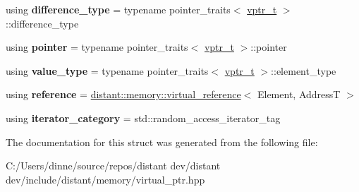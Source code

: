 \begin{DoxyCompactItemize}
\item 
\mbox{\label{structstd_1_1iterator__traits_3_01distant_1_1memory_1_1virtual__ptr_3_01_element_00_01_address_t_01_4_01_4_a0574fcbe68898aabe830c86f39a2679d}} 
using {\bfseries difference\+\_\+type} = typename pointer\+\_\+traits$<$ \mbox{\hyperlink{classdistant_1_1memory_1_1virtual__ptr}{vptr\+\_\+t}} $>$\+::difference\+\_\+type
\item 
\mbox{\label{structstd_1_1iterator__traits_3_01distant_1_1memory_1_1virtual__ptr_3_01_element_00_01_address_t_01_4_01_4_af3dc39ab8e8fcda98f26a58b6eef64a0}} 
using {\bfseries pointer} = typename pointer\+\_\+traits$<$ \mbox{\hyperlink{classdistant_1_1memory_1_1virtual__ptr}{vptr\+\_\+t}} $>$\+::pointer
\item 
\mbox{\label{structstd_1_1iterator__traits_3_01distant_1_1memory_1_1virtual__ptr_3_01_element_00_01_address_t_01_4_01_4_a97c5fe38887d6eabf3a75871c5e8d49c}} 
using {\bfseries value\+\_\+type} = typename pointer\+\_\+traits$<$ \mbox{\hyperlink{classdistant_1_1memory_1_1virtual__ptr}{vptr\+\_\+t}} $>$\+::element\+\_\+type
\item 
\mbox{\label{structstd_1_1iterator__traits_3_01distant_1_1memory_1_1virtual__ptr_3_01_element_00_01_address_t_01_4_01_4_a73730119926d04f012b91ab1cedec94e}} 
using {\bfseries reference} = \mbox{\hyperlink{classdistant_1_1memory_1_1virtual__reference}{distant\+::memory\+::virtual\+\_\+reference}}$<$ Element, AddressT $>$
\item 
\mbox{\label{structstd_1_1iterator__traits_3_01distant_1_1memory_1_1virtual__ptr_3_01_element_00_01_address_t_01_4_01_4_a808047c9bf3da29e18c6e8717df8b14c}} 
using {\bfseries iterator\+\_\+category} = std\+::random\+\_\+access\+\_\+iterator\+\_\+tag
\end{DoxyCompactItemize}


The documentation for this struct was generated from the following file\+:\begin{DoxyCompactItemize}
\item 
C\+:/\+Users/dinne/source/repos/distant dev/distant dev/include/distant/memory/virtual\+\_\+ptr.\+hpp\end{DoxyCompactItemize}
